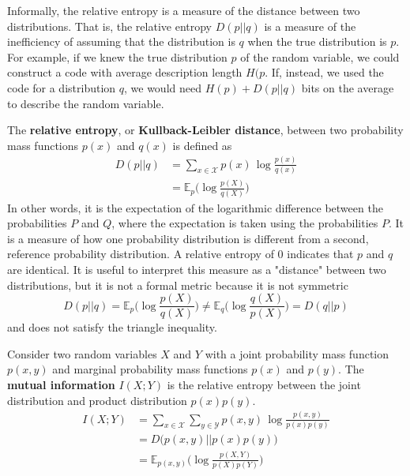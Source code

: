 \documentclass{article}
\begin{document}
  Informally, the relative entropy is a measure of the distance between two distributions. That is, the relative entropy $D(p||q)$ is a measure of the inefficiency of assuming that the distribution is $q$ when the true distribution is $p$. For example, if we knew the true distribution $p$ of the random variable, we could construct a code with average description length $H(p$. If, instead, we used the code for a distribution $q$, we would need $H(p) + D(p||q)$ bits on the average to describe the random variable. 

  \begin{definition}
  The \textbf{relative entropy}, or \textbf{Kullback-Leibler distance}, between two probability mass functions $p(x)$ and $q(x)$ is defined as 
  \begin{align*}
      D(p||q) & = \sum_{x \in \mathcal{X}} p(x) \, \log \frac{p(x)}{q(x)} \\
      & = \mathbb{E}_p \bigg( \log \frac{p(X)}{q(X)} \bigg)
  \end{align*}
  In other words, it is the expectation of the logarithmic difference between the probabilities $P$ and $Q$, where the expectation is taken using the probabilities $P$. It is a measure of how one probability distribution is different from a second, reference probability distribution. A relative entropy of $0$ indicates that $p$ and $q$ are identical. It is useful to interpret this measure as a "distance" between two distributions, but it is not a formal metric because it is not symmetric 
  \[D(p||q) = \mathbb{E}_p \bigg( \log \frac{p(X)}{q(X)} \bigg) \neq \mathbb{E}_q \bigg( \log \frac{q(X)}{p(X)} \bigg) = D(q||p)\]
  and does not satisfy the triangle inequality. 
  \end{definition}

  \begin{definition}
  Consider two random variables $X$ and $Y$ with a joint probability mass function $p(x, y)$ and marginal probability mass functions $p(x)$ and $p(y)$. The \textbf{mutual information} $I(X; Y)$ is the relative entropy between the joint distribution and product distribution $p(x) p(y)$. 
  \begin{align*}
      I(X;Y) & = \sum_{x \in \mathcal{X}} \sum_{y \in \mathcal{Y}} p(x, y)\, \log \frac{p(x, y)}{p(x) p(y)} \\
      & = D\big( p(x, y)||p(x) p(y)\big) \\
      & = \mathbb{E}_{p(x, y)} \bigg( \log \frac{p(X, Y)}{p(X) p(Y)} \bigg)
  \end{align*}
  \end{definition}
\end{document}
